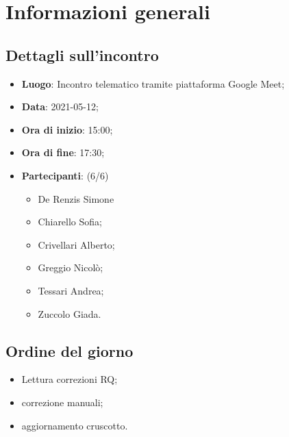 \section{Informazioni generali}

\subsection{Dettagli sull'incontro}
\begin{itemize}
\item \textbf{Luogo}: Incontro telematico tramite piattaforma Google Meet;
\item \textbf{Data}: 2021-05-12;
\item \textbf{Ora di inizio}: 15:00;
\item \textbf{Ora di fine}: 17:30;
\item \textbf{Partecipanti}: (6/6) 
\begin{itemize}
	\item De Renzis Simone
	\item Chiarello Sofia;
	\item Crivellari Alberto;
	\item Greggio Nicolò;
	\item Tessari Andrea;
	\item Zuccolo Giada.
\end{itemize}
\end{itemize}

\subsection{Ordine del giorno}
\begin{itemize}
	\item Lettura correzioni RQ;
	\item correzione manuali;
	\item aggiornamento cruscotto.
\end{itemize}


